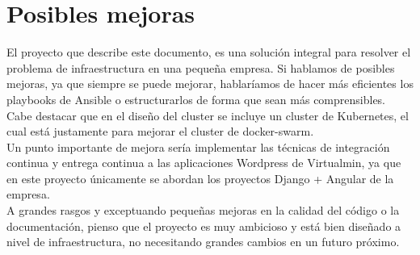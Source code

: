 \section{Posibles mejoras}
        \begin{text}
                El proyecto que describe este documento, es una solución integral para resolver el problema de infraestructura en una pequeña empresa. Si hablamos de posibles mejoras, ya que siempre se puede mejorar, hablaríamos de hacer más eficientes los playbooks de Ansible o estructurarlos de forma que sean más comprensibles. Cabe destacar que en el diseño del cluster se incluye un cluster de Kubernetes, el cual está justamente para mejorar el cluster de docker-swarm. \\
                Un punto importante de mejora sería implementar las técnicas de integración continua y entrega continua a las aplicaciones Wordpress de Virtualmin, ya que en este proyecto únicamente se abordan los proyectos Django + Angular de la empresa. \\
                A grandes rasgos y exceptuando pequeñas mejoras en la calidad del código o la documentación, pienso que el proyecto es muy ambicioso y está bien diseñado a nivel de infraestructura, no necesitando grandes cambios en un futuro próximo.
        \end{text}